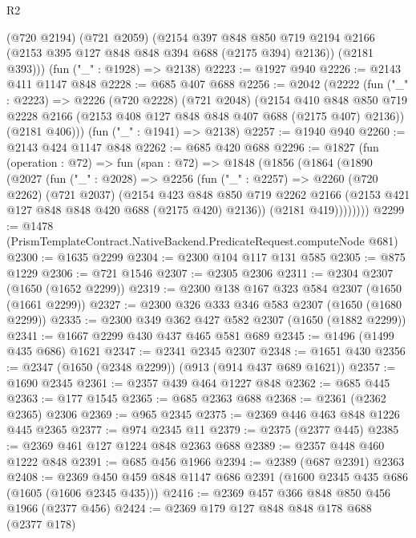 \begin{lexlean}{R2}
\begin{coremodule}
        (@720 @2194)
        (@721 @2059)
        (@2154
          @397
          @848
          @850
          @719
          @2194
          @2166
          (@2153 @395 @127 @848 @848 @394 @688 (@2175 @394) @2136))
        (@2181 @393)))
    (fun ("_" : @1928) => @2138)
@2223 := @1927 @940
@2226 := @2143 @411 @1147 @848
@2228 := @685 @407 @688
@2256 := @2042
    (@2222
      (fun ("_" : @2223) =>
      @2226
        (@720 @2228)
        (@721 @2048)
        (@2154
          @410
          @848
          @850
          @719
          @2228
          @2166
          (@2153 @408 @127 @848 @848 @407 @688 (@2175 @407) @2136))
        (@2181 @406)))
    (fun ("_" : @1941) => @2138)
@2257 := @1940 @940
@2260 := @2143 @424 @1147 @848
@2262 := @685 @420 @688
@2296 := @1827
    (fun (operation : @72) =>
    fun (span : @72) =>
    @1848
      (@1856
        (@1864
          (@1890
            (@2027
              (fun ("_" : @2028) =>
              @2256
                (fun ("_" : @2257) =>
                @2260
                  (@720 @2262)
                  (@721 @2037)
                  (@2154
                    @423
                    @848
                    @850
                    @719
                    @2262
                    @2166
                    (@2153 @421 @127 @848 @848 @420 @688 (@2175 @420) @2136))
                  (@2181 @419))))))))
@2299 := @1478 (PrismTemplateContract.NativeBackend.PredicateRequest.computeNode @681)
@2300 := @1635 @2299
@2304 := @2300 @104 @117 @131 @585
@2305 := @875 @1229
@2306 := @721 @1546
@2307 := @2305 @2306
@2311 := @2304 @2307 (@1650 (@1652 @2299))
@2319 := @2300 @138 @167 @323 @584 @2307 (@1650 (@1661 @2299))
@2327 := @2300 @326 @333 @346 @583 @2307 (@1650 (@1680 @2299))
@2335 := @2300 @349 @362 @427 @582 @2307 (@1650 (@1882 @2299))
@2341 := @1667 @2299 @430 @437 @465 @581 @689
@2345 := @1496 (@1499 @435 @686) @1621
@2347 := @2341 @2345 @2307
@2348 := @1651 @430
@2356 := @2347 (@1650 (@2348 @2299)) (@913 (@914 @437 @689 @1621))
@2357 := @1690 @2345
@2361 := @2357 @439 @464 @1227 @848
@2362 := @685 @445
@2363 := @177 @1545
@2365 := @685 @2363 @688
@2368 := @2361 (@2362 @2365) @2306
@2369 := @965 @2345
@2375 := @2369 @446 @463 @848 @1226 @445 @2365
@2377 := @974 @2345 @11
@2379 := @2375 (@2377 @445)
@2385 := @2369 @461 @127 @1224 @848 @2363 @688
@2389 := @2357 @448 @460 @1222 @848
@2391 := @685 @456 @1966
@2394 := @2389 (@687 @2391) @2363
@2408 := @2369 @450 @459 @848 @1147 @686 @2391 (@1600 @2345 @435 @686 (@1605 (@1606 @2345 @435)))
@2416 := @2369 @457 @366 @848 @850 @456 @1966 (@2377 @456)
@2424 := @2369 @179 @127 @848 @848 @178 @688 (@2377 @178)

\end{coremodule}
\end{lexlean}

